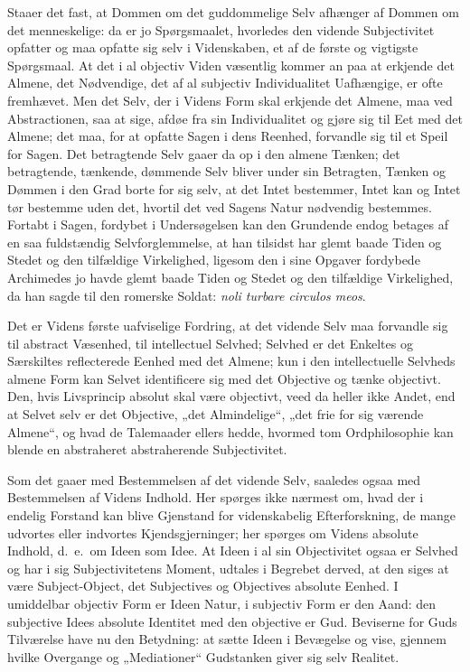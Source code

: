 \documentclass[12pt]{book}
\begin{document}
Staaer det fast, at Dommen om det guddommelige Selv afhænger af
Dommen om det menneskelige: da er jo Spørgsmaalet, hvorledes den
vidende Subjectivitet opfatter og maa opfatte sig selv i
Videnskaben, et af de første og vigtigste Spørgsmaal. At det i al
objectiv Viden væsentlig kommer an paa at erkjende det Almene, det
Nødvendige, det af al subjectiv Individualitet Uafhængige, er ofte
fremhævet. Men det Selv, der i Videns Form skal erkjende det
Almene, maa ved Abstractionen, saa at sige, afdøe fra sin
Individualitet og gjøre sig til Eet med det Almene; det maa, for at
opfatte Sagen i dens Reenhed, forvandle sig til et Speil for Sagen.
Det betragtende Selv gaaer da op i den almene Tænken; det
betragtende, tænkende, dømmende Selv bliver under sin Betragten,
Tænken og Dømmen i den Grad borte for sig selv, at det Intet
bestemmer, Intet kan og Intet tør bestemme uden det, hvortil det ved
Sagens Natur nødvendig bestemmes. Fortabt i Sagen, fordybet i
Undersøgelsen kan den Grundende endog betages af en saa fuldstændig
Selvforglemmelse, at han tilsidst har glemt baade Tiden og Stedet og
den tilfældige Virkelighed, ligesom den i sine Opgaver fordybede
Archimedes jo havde glemt baade Tiden og Stedet og den tilfældige
Virkelighed, da han sagde til den romerske Soldat: \textit{noli
turbare circulos meos}.

Det er Videns første uafviselige Fordring, at det vidende Selv maa
forvandle sig til abstract Væsenhed, til intellectuel Selvhed;
Selvhed er det Enkeltes og Særskiltes reflecterede Eenhed med det
Almene; kun i den intellectuelle Selvheds almene Form kan Selvet
identificere sig med det Objective og tænke objectivt. Den, hvis
Livsprincip absolut skal være objectivt, veed da heller ikke
Andet, end at Selvet selv er det Objective, „det Almindelige“, „det
frie for sig værende Almene“, og hvad de Talemaader ellers hedde,
hvormed tom Ordphilosophie kan blende en abstraheret abstraherende
Subjectivitet.

Som det gaaer med Bestemmelsen af det vidende Selv, saaledes ogsaa
med Bestemmelsen af Videns Indhold. Her spørges ikke nærmest om,
hvad der i endelig Forstand kan blive Gjenstand for videnskabelig
Efterforskning, de mange udvortes eller indvortes Kjendsgjerninger;
her spørges om Videns absolute Indhold, d.\ e.\ om Ideen som Idee.
At Ideen i al sin Objectivitet ogsaa er Selvhed og har i sig
Subjectivitetens Moment, udtales i Begrebet derved, at den siges at
være Subject-Object, det Subjectives og Objectives absolute Eenhed.
I umiddelbar objectiv Form er Ideen Natur, i subjectiv Form er den
Aand: den subjective Idees absolute Identitet med den objective er
Gud. Beviserne for Guds Tilværelse have nu den Betydning: at sætte
Ideen i Bevægelse og vise, gjennem hvilke Overgange og
„Mediationer“ Gudstanken giver sig selv Realitet.
\end{document}
